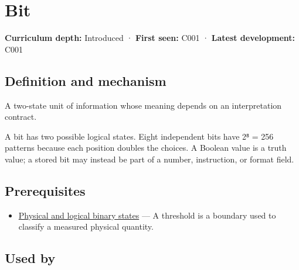\hypertarget{appendix-ddbb69998a2e}{}\label{referencestart:appendix-ddbb69998a2e}
\section{Bit}\label{appendix-ddbb69998a2e-bit}

\hypertarget{appendix-ddbb69998a2e-bit}{}

\textbf{Curriculum depth:} Introduced · \textbf{First seen:} C001 · \textbf{Latest development:} C001

\begin{allmightroledefinition}

\subsection{Definition and mechanism}\label{appendix-ddbb69998a2e-definition-and-mechanism}

\hypertarget{appendix-ddbb69998a2e-definition-and-mechanism}{}

A two-state unit of information whose meaning depends on an interpretation contract.

\end{allmightroledefinition}

A bit has two possible logical states. Eight independent bits have 2⁸ = 256 patterns because each position doubles the choices. A Boolean value is a truth value; a stored bit may instead be part of a number, instruction, or format field.

\subsection{Prerequisites}\label{appendix-ddbb69998a2e-prerequisites}

\hypertarget{appendix-ddbb69998a2e-prerequisites}{}

\begin{itemize}
\tightlist
\item
  \hyperref[appendix-ea798b1ceb35]{Physical and logical binary states} --- A threshold is a boundary used to classify a measured physical quantity.
\end{itemize}

\subsection{Used by}\label{appendix-ddbb69998a2e-used-by}

\hypertarget{appendix-ddbb69998a2e-used-by}{}

